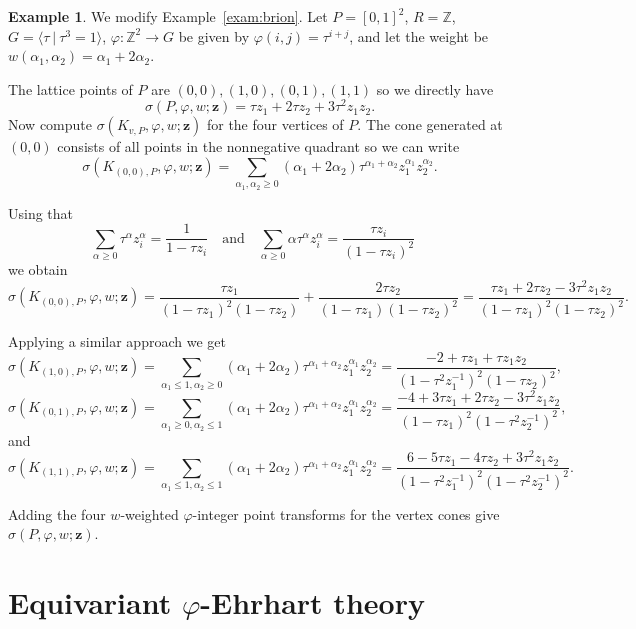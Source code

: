 \documentclass[12pt,reqno]{amsart}
\theoremstyle{definition}
\newtheorem{exam}[thm]{Example}
\theoremstyle{remark}
\newcommand{\Z}{\mathbb{Z}}
\renewcommand{\phi}{\varphi}
\begin{document}
\begin{exam}
We modify Example~\ref{exam:brion}. Let $P=[0,1]^2$, $R=\Z$, $G=\langle \tau \ | \ \tau^3=1\rangle$, $\phi:\Z^2 \to G$ be given by $\varphi(i,j)=\tau^{i+j}$, and let the weight be $w(\alpha_1,\alpha_2)=\alpha_1+2\alpha_2$.

The lattice points of $P$ are $(0,0),(1,0),(0,1),(1,1)$ so we directly have
\[
\sigma(P,\phi,w; \mathbf{z})=\tau z_1 + 2\tau z_2 + 3\tau^2 z_1z_2.
\]
Now compute $\sigma(K_{v,P},\phi,w;\mathbf{z})$ for the four vertices of $P$. The cone  generated at $(0,0)$ consists of all points in the nonnegative quadrant so we can write
\[
\sigma(K_{(0,0),P},\phi,w;\mathbf{z})=\sum_{\alpha_1,\alpha_2\geq 0}(\alpha_1+2\alpha_2)\tau^{\alpha_1+\alpha_2}z_1^{\alpha_1}z_2^{\alpha_2}.
\]

Using that 
\[\sum_{\alpha\geq 0} \tau^\alpha z_i^\alpha=\frac{1}{1-\tau z_i} \quad \text{and} \quad \sum_{\alpha\geq 0} \alpha \tau^\alpha z_i^\alpha=\frac{\tau z_i}{(1-\tau z_i)^2} \quad \]
we obtain
\[
\sigma(K_{(0,0),P},\phi,w;\mathbf{z})=\frac{\tau z_1}{(1-\tau z_1)^2(1-\tau z_2)}+\frac{2\tau z_2}{(1-\tau z_1)(1-\tau z_2)^2}=\frac{\tau z_1 +2\tau z_2-3\tau^2z_1z_2}{(1-\tau z_1)^2(1-\tau z_2)^2}.
\]

Applying a similar approach we get
\[
\sigma(K_{(1,0),P},\phi,w;\mathbf{z})=\sum_{\alpha_1\leq 1,\alpha_2\geq 0} (\alpha_1+2\alpha_2)\tau^{\alpha_1+\alpha_2}z_1^{\alpha_1}z_2^{\alpha_2}=\frac{-2+\tau z_1+\tau z_1z_2}{(1-\tau^2 z_1^{-1})^2(1-\tau z_2)^2},
\]
\[
\sigma(K_{(0,1),P},\phi,w;\mathbf{z})=\sum_{\alpha_1\geq 0,\alpha_2\leq 1} (\alpha_1+2\alpha_2)\tau^{\alpha_1+\alpha_2}z_1^{\alpha_1}z_2^{\alpha_2}=\frac{-4+3\tau z_1+2\tau z_2-3\tau^2 z_1z_2}{(1-\tau z_1)^2(1-\tau^2 z_2^{-1})^2},
\]
and
\[
\sigma(K_{(1,1),P},\phi,w;\mathbf{z})=\sum_{\alpha_1\leq 1,\alpha_2\leq 1} (\alpha_1+2\alpha_2)\tau^{\alpha_1+\alpha_2}z_1^{\alpha_1}z_2^{\alpha_2}=\frac{6-5\tau z_1-4\tau z_2+3\tau^2 z_1z_2}{(1-\tau^2 z_1^{-1})^2(1-\tau^2 z_2^{-1})^2}.
\]

Adding the four $w$-weighted $\phi$-integer point transforms for the vertex cones give $\sigma(P,\phi,w;\mathbf z)$.
\end{exam}




\section{Equivariant $\varphi$-Ehrhart theory} 
\label{sec:phiEquivariantEhrhart}
 
\end{document}
